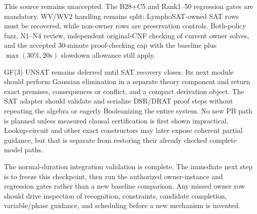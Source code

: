 \documentclass[11pt]{article}
\begin{document}
This source remains unaccepted.  The B28+C5 and Rank1--50 regression gates are
mandatory.  WV/WV2 handling remains split: LymphoSAT-owned SAT rows must be
recovered, while non-owner rows are preservation controls.  Both-policy fuzz,
N1--N4 review, independent original-CNF checking of current owner solves, and
the accepted 30-minute proof-checking cap with the baseline plus
$\max(30\%,20\mathrm{s})$ slowdown allowance still apply.

GF(3) UNSAT remains deferred until SAT recovery closes.  Its next module should
perform Gaussian elimination in a separate theory component and return exact
premises, consequences or conflict, and a compact derivation object.  The SAT
adapter should validate and serialize DSR/DRAT proof steps without repeating
the algebra or eagerly Booleanizing the entire system.  No new PB path is
planned unless measured clausal certification is first shown impractical.
Lookup-circuit and other exact constructors may later expose coherent partial
guidance, but that is separate from restoring their already checked complete
model paths.

The normal-duration integration validation is complete.  The immediate next
step is to freeze this checkpoint, then run the authorized owner-instance and
regression gates rather than a new
baseline comparison.  Any missed owner row should drive inspection of
recognition, constraints, candidate completion, variable/phase guidance, and
scheduling before a new mechanism is invented.
\end{document}
